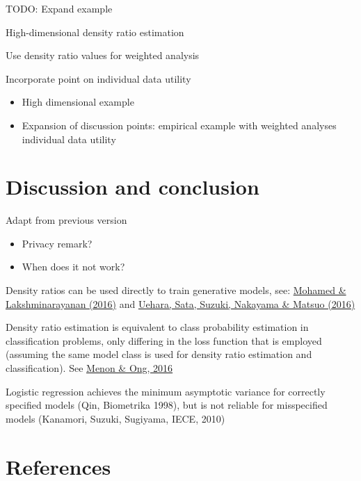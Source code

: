 \documentclass[
]{article}
\providecommand{\tightlist}{%
  \setlength{\itemsep}{0pt}\setlength{\parskip}{0pt}}\usepackage{longtable,booktabs,array}
\begin{document}
TODO: Expand example

High-dimensional density ratio estimation

Use density ratio values for weighted analysis

Incorporate point on individual data utility

\begin{itemize}
\tightlist
\item
  High dimensional example
\item
  Expansion of discussion points: empirical example with weighted
  analyses individual data utility
\end{itemize}

\hypertarget{discussion-and-conclusion}{%
\section{Discussion and conclusion}\label{discussion-and-conclusion}}

Adapt from previous version

\begin{itemize}
\tightlist
\item
  Privacy remark?
\item
  When does it not work?
\end{itemize}

Density ratios can be used directly to train generative models, see:
\href{https://arxiv.org/pdf/1610.03483}{Mohamed \& Lakshminarayanan
(2016)} and \href{https://arxiv.org/pdf/1610.02920.pdf}{Uehara, Sata,
Suzuki, Nakayama \& Matsuo (2016)}

Density ratio estimation is equivalent to class probability estimation
in classification problems, only differing in the loss function that is
employed (assuming the same model class is used for density ratio
estimation and classification). See
\href{https://proceedings.mlr.press/v48/menon16.pdf}{Menon \& Ong, 2016}

Logistic regression achieves the minimum asymptotic variance for
correctly specified models (Qin, Biometrika 1998), but is not reliable
for misspecified models (Kanamori, Suzuki, Sugiyama, IECE, 2010)

\hypertarget{references}{%
\section*{References}\label{references}}
\end{document}
